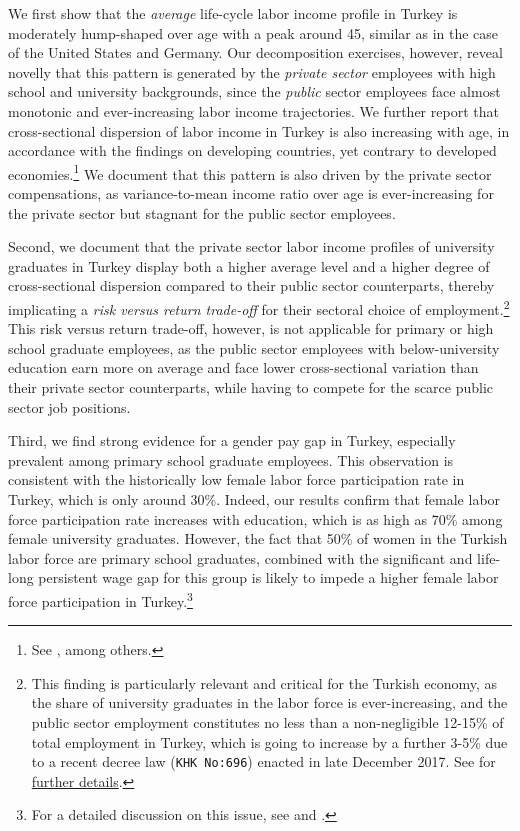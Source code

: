 \documentclass[12pt,author-year]{article}
\begin{document}
We first show that the \emph{average} life-cycle labor income profile in Turkey is moderately hump-shaped over age with a peak around 45, similar as in the case of the United States and Germany. Our decomposition exercises, however, reveal novelly that this pattern is generated by the \emph{private sector} employees with high school and university backgrounds, since the \emph{public} sector employees face almost monotonic and ever-increasing labor income trajectories. We further report that cross-sectional dispersion of labor income in Turkey is also increasing with age, in accordance with the findings on developing countries, yet contrary to developed economies.\footnote{See \cite{Lagakos}, among others.} We document that this pattern is also driven by the private sector compensations, as variance-to-mean income ratio over age is ever-increasing for the private sector but stagnant for the public sector employees.

Second, we document that the private sector labor income profiles of university graduates in Turkey display both a higher average level and a higher degree of cross-sectional dispersion compared to their public sector counterparts, thereby implicating a \emph{risk versus return trade-off} for their sectoral choice of employment.\footnote{This finding is particularly relevant and critical for the Turkish economy, as the share of university graduates in the labor force is ever-increasing, and the public sector employment constitutes no less than a non-negligible 12-15\% of total employment in Turkey, which is going to increase by a further 3-5\% due to a recent decree law (\texttt{KHK No:696}) enacted in late December 2017. See \cite{OECD2} for \href{http://www.oecd.org/gov/Turkey.pdf}{further details}.} This risk versus return trade-off, however, is not applicable for primary or high school graduate employees, as the public sector employees with below-university education earn more on average and face lower cross-sectional variation than their private sector counterparts, while having to compete for the scarce public sector job positions.


Third, we find strong evidence for a gender pay gap in Turkey, especially prevalent among primary school graduate employees. This observation is consistent with the historically low female labor force participation rate in Turkey, which is only around 30\%. Indeed, our results confirm that female labor force participation rate increases with education, which is as high as 70\% among female university graduates. However, the fact that 50\% of women in the Turkish labor force are primary school graduates, combined with the significant and life-long persistent wage gap for this group is likely to impede a higher female labor force participation in Turkey.\footnote{For a detailed discussion on this issue, see \cite{SPO2010} and \cite{Tansel94}.}
\end{document}
